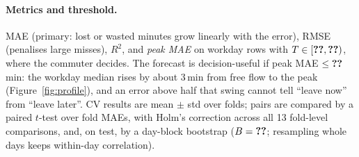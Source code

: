 \paragraph{Metrics and threshold.} MAE (primary: lost or wasted minutes grow linearly with the
error), RMSE (penalises large misses), $R^2$, and \emph{peak MAE} on workday rows with
$T\in[\res{cfg.peakStart},\res{cfg.peakEnd})$, where the commuter decides. The forecast is
decision-useful if peak MAE $\leq\res{cfg.threshold}$\,min: the workday median rises by about
3\,min from free flow to the peak (Figure~\ref{fig:profile}), and an error above half that swing
cannot tell ``leave now'' from ``leave later''. CV results are mean $\pm$ std over folds; pairs are
compared by a paired $t$-test over fold MAEs, with Holm's correction \citep{holm1979} across
all 13 fold-level comparisons, and, on test, by a day-block bootstrap
($B=\res{cfg.bootstrapB}$; resampling whole days keeps within-day correlation).
